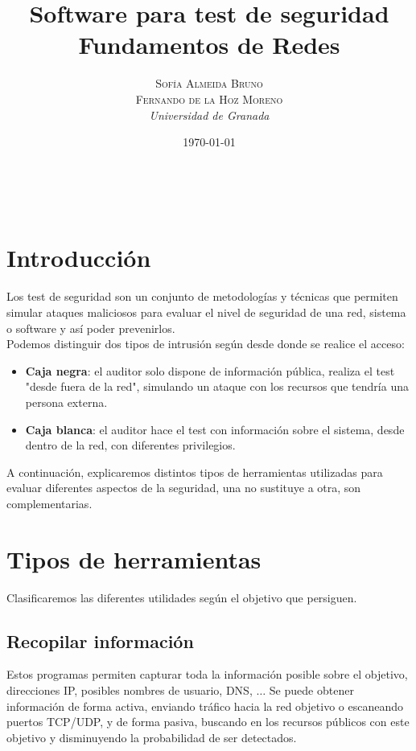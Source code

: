 \documentclass[a4paper, 11pt]{article}
\title{\textbf{Software para test de seguridad}\\ %
Fundamentos de Redes} %
\author{\textsc{Sofía Almeida Bruno\\Fernando de la Hoz Moreno} %
\\{\textit{Universidad de Granada}}} %
\date{\today} %
\makeatletter
\theoremstyle{plain}
\renewcommand{\maketitle}{
  \begin{flushright} %
  
  {\LARGE\@title} %
  
  \vspace{50pt} %
  
  {\large\@author} %
  \\\@date %
  \vspace{40pt} %
  \end{flushright}
}
\makeatother
\begin{document}
\maketitle %
\newpage
\tableofcontents
\newpage

\section{Introducción}

Los test de seguridad son un conjunto de metodologías y técnicas que permiten simular ataques maliciosos para evaluar el nivel de seguridad de una red, sistema o software y así poder prevenirlos.\\

Podemos distinguir dos tipos de intrusión según desde donde se realice el acceso:
\begin{itemize}
	\item \textbf{Caja negra}: el auditor solo dispone de información pública, realiza el test "desde fuera de la red", simulando un ataque con los recursos que tendría una persona externa.
		\item \textbf{Caja blanca}: el auditor hace el test con información sobre el sistema, desde dentro de la red, con diferentes privilegios.
\end{itemize}

A continuación, explicaremos distintos tipos de herramientas utilizadas para evaluar diferentes aspectos de la seguridad, una no sustituye a otra, son complementarias.


\section{Tipos de herramientas}

Clasificaremos las diferentes utilidades según el objetivo que persiguen.

\subsection{Recopilar información}
Estos programas permiten capturar toda la información posible sobre el objetivo, direcciones IP, posibles nombres de usuario, DNS, $\dots$ Se puede obtener información de forma activa, enviando tráfico hacia la red objetivo o escaneando puertos TCP/UDP, y de forma pasiva, buscando en los recursos públicos con este objetivo y disminuyendo la probabilidad de ser detectados.
\end{document}

